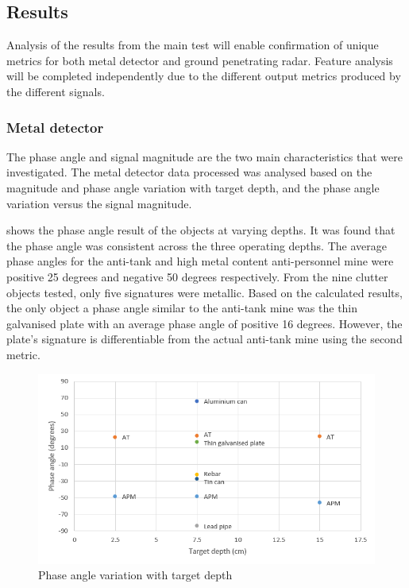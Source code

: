\documentclass[main.tex]{subfiles}
\begin{document}
\subsection{Results}
Analysis of the results from the main test will enable confirmation of unique metrics for both metal detector and ground penetrating radar. Feature analysis will be completed independently due to the different output metrics produced by the different signals. 

\subsubsection{Metal detector}
The phase angle and signal magnitude are the two main characteristics that were investigated. The metal detector data processed was analysed based on the magnitude and phase angle variation with target depth, and the phase angle variation versus the signal magnitude.

 shows the phase angle result of the objects at varying depths. It was found that the phase angle was consistent across the three operating depths. The average phase angles for the anti-tank and high metal content anti-personnel mine were positive 25 degrees and negative 50 degrees respectively. From the nine clutter objects tested, only five signatures were metallic. Based on the calculated results, the only object a phase angle similar to the anti-tank mine was the thin galvanised plate with an average phase angle of positive 16 degrees. However, the plate’s signature is differentiable from the actual anti-tank mine using the second metric. 
\begin{figure}[ht]
\includegraphics[width=\textwidth]{5-Testing/phaseDepth.PNG}
\centering
\caption{Phase angle variation with target depth }
\end{figure}
\end{document}
